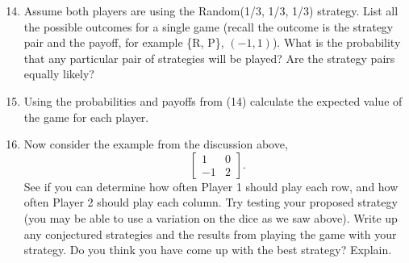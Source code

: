 \begin{enumerate}
\setcounter{enumi}{13}

\item Assume both players are using the Random(1/3, 1/3, 1/3) strategy. List all the possible outcomes for a single game (recall the outcome is the strategy pair and the payoff, for example \{R, P\}, $(-1, 1)$). What is the probability that any particular pair of strategies will be played? Are the strategy pairs equally likely? 

\vspace{.1in}

\item Using the probabilities and payoffs from (14) calculate the expected value of the game for each player.

\vspace{.1in}


\item Now consider the example from the discussion above, 
\[\left[\begin{matrix}
1&0\\
-1&2

\end{matrix}\right].
\]
See if you can determine how often Player 1 should play each row, and how often Player 2 should play each column. Try testing your proposed strategy (you may be able to use a variation on the dice as we saw above). Write up any conjectured strategies and the results from playing the game with your strategy. Do you think you have come up with the best strategy? Explain.
\vspace{.1in}



\end{enumerate}




 